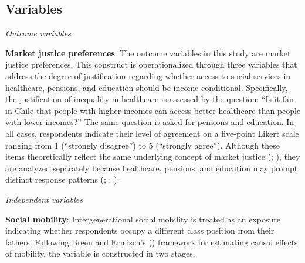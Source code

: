 \documentclass[
  13pt,
]{article}
\begin{document}
\subsection{Variables}\label{variables}

\emph{Outcome variables}

\textbf{Market justice preferences}: The outcome variables in this study
are market justice preferences. This construct is operationalized
through three variables that address the degree of justification
regarding whether access to social services in healthcare, pensions, and
education should be income conditional. Specifically, the justification
of inequality in healthcare is assessed by the question: ``Is it fair in
Chile that people with higher incomes can access better healthcare than
people with lower incomes?'' The same question is asked for pensions and
education. In all cases, respondents indicate their level of agreement
on a five-point Likert scale ranging from 1 (``strongly disagree'') to 5
(``strongly agree''). Although these items theoretically reflect the
same underlying concept of market justice
(;
), they are analyzed
separately because healthcare, pensions, and education may prompt
distinct response patterns
(;
;
).

\emph{Independent variables}

\textbf{Social mobility}: Intergenerational social mobility is treated
as an exposure indicating whether respondents occupy a different class
position from their fathers. Following Breen and Ermisch's
() framework for estimating
causal effects of mobility, the variable is constructed in two stages.
\end{document}
